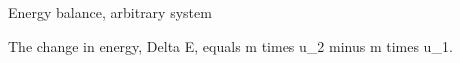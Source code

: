 Energy balance, arbitrary system

The change in energy, Delta E, equals m times u_2 minus m times u_1.